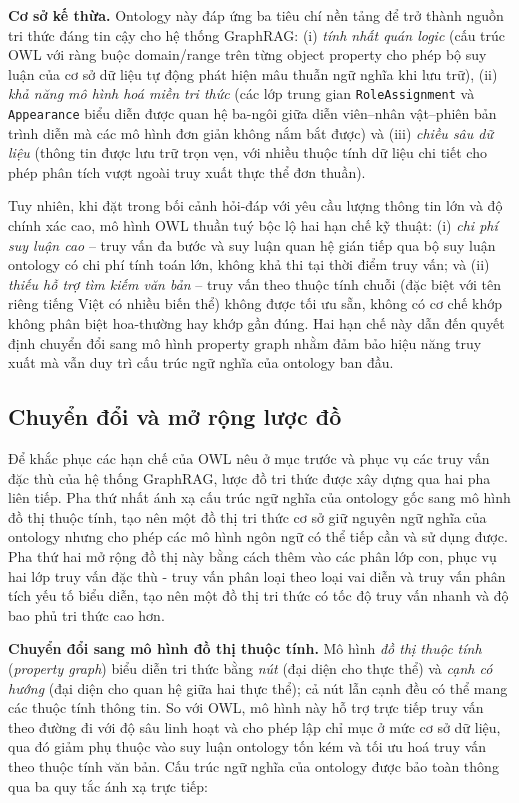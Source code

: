 \textbf{Cơ sở kế thừa.}
Ontology này đáp ứng ba tiêu chí nền tảng để trở thành nguồn tri thức đáng tin cậy cho hệ thống GraphRAG: (i) \textit{tính nhất quán logic} (cấu trúc OWL với ràng buộc domain/range trên từng object property cho phép bộ suy luận của cơ sở dữ liệu tự động phát hiện mâu thuẫn ngữ nghĩa khi lưu trữ), (ii) \textit{khả năng mô hình hoá miền tri thức} (các lớp trung gian \texttt{RoleAssignment} và \texttt{Appearance} biểu diễn được quan hệ ba-ngôi giữa diễn viên–nhân vật–phiên bản trình diễn mà các mô hình đơn giản không nắm bắt được) và (iii) \textit{chiều sâu dữ liệu} (thông tin được lưu trữ trọn vẹn, với nhiều thuộc tính dữ liệu chi tiết cho phép phân tích vượt ngoài truy xuất thực thể đơn thuần).

Tuy nhiên, khi đặt trong bối cảnh hỏi-đáp với yêu cầu lượng thông tin lớn và độ chính xác cao, mô hình OWL thuần tuý bộc lộ hai hạn chế kỹ thuật: (i) \textit{chi phí suy luận cao} -- truy vấn đa bước và suy luận quan hệ gián tiếp qua bộ suy luận ontology có chi phí tính toán lớn, không khả thi tại thời điểm truy vấn; và (ii)\textit{ thiếu hỗ trợ tìm kiếm văn bản} -- truy vấn theo thuộc tính chuỗi (đặc biệt với tên riêng tiếng Việt có nhiều biến thể) không được tối ưu sẵn, không có cơ chế khớp không phân biệt hoa-thường hay khớp gần đúng. Hai hạn chế này dẫn đến quyết định chuyển đổi sang mô hình property graph nhằm đảm bảo hiệu năng truy xuất mà vẫn duy trì cấu trúc ngữ nghĩa của ontology ban đầu.

\subsection{Chuyển đổi và mở rộng lược đồ}
\label{sec:schema_extension}

Để khắc phục các hạn chế của OWL nêu ở mục trước và phục vụ các truy vấn đặc thù của hệ thống GraphRAG, lược đồ tri thức được xây dựng qua hai pha liên tiếp. Pha thứ nhất ánh xạ cấu trúc ngữ nghĩa của ontology gốc sang mô hình đồ thị thuộc tính, tạo nên một đồ thị tri thức cơ sở giữ nguyên ngữ nghĩa của ontology nhưng cho phép các mô hình ngôn ngữ có thể tiếp cần và sử dụng được. Pha thứ hai mở rộng đồ thị này bằng cách thêm vào các phân lớp con, phục vụ hai lớp truy vấn đặc thù - truy vấn phân loại theo loại vai diễn và truy vấn phân tích yếu tố biểu diễn, tạo nên một đồ thị tri thức có tốc độ truy vấn nhanh và độ bao phủ tri thức cao hơn.

\textbf{Chuyển đổi sang mô hình đồ thị thuộc tính.}
Mô hình \textit{đồ thị thuộc tính} (\textit{property graph}) biểu diễn tri thức bằng \textit{nút} (đại diện cho thực thể) và \textit{cạnh có hướng} (đại diện cho quan hệ giữa hai thực thể); cả nút lẫn cạnh đều có thể mang các thuộc tính thông tin. So với OWL, mô hình này hỗ trợ trực tiếp truy vấn theo đường đi với độ sâu linh hoạt và cho phép lập chỉ mục ở mức cơ sở dữ liệu, qua đó giảm phụ thuộc vào suy luận ontology tốn kém và tối ưu hoá truy vấn theo thuộc tính văn bản. Cấu trúc ngữ nghĩa của ontology được bảo toàn thông qua ba quy tắc ánh xạ trực tiếp:

